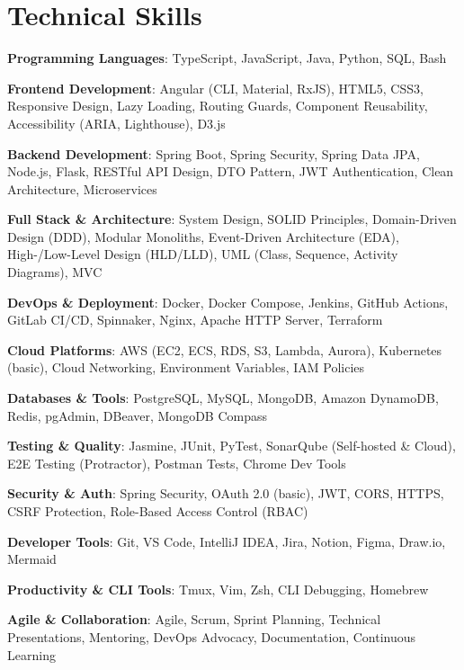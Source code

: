 \documentclass[10pt, letterpaper]{article}
\newenvironment{onecolentry}{\begin{adjustwidth}{0 cm}{0 cm}}{\end{adjustwidth}}
\begin{document}
\section{Technical Skills}
\begin{onecolentry}
    \item \textbf{Programming Languages}: TypeScript, JavaScript, Java, Python, SQL, Bash
    \item \textbf{Frontend Development}: Angular (CLI, Material, RxJS), HTML5, CSS3, Responsive Design, Lazy Loading, Routing Guards, Component Reusability, Accessibility (ARIA, Lighthouse), D3.js
    \item \textbf{Backend Development}: Spring Boot, Spring Security, Spring Data JPA, Node.js, Flask, RESTful API Design, DTO Pattern, JWT Authentication, Clean Architecture, Microservices
    \item \textbf{Full Stack \& Architecture}: System Design, SOLID Principles, Domain-Driven Design (DDD), Modular Monoliths, Event-Driven Architecture (EDA), High-/Low-Level Design (HLD/LLD), UML (Class, Sequence, Activity Diagrams), MVC
    \item \textbf{DevOps \& Deployment}: Docker, Docker Compose, Jenkins, GitHub Actions, GitLab CI/CD, Spinnaker, Nginx, Apache HTTP Server, Terraform
    \item \textbf{Cloud Platforms}: AWS (EC2, ECS, RDS, S3, Lambda, Aurora), Kubernetes (basic), Cloud Networking, Environment Variables, IAM Policies
    \item \textbf{Databases \& Tools}: PostgreSQL, MySQL, MongoDB, Amazon DynamoDB, Redis, pgAdmin, DBeaver, MongoDB Compass
    \item \textbf{Testing \& Quality}: Jasmine, JUnit, PyTest, SonarQube (Self-hosted \& Cloud), E2E Testing (Protractor), Postman Tests, Chrome Dev Tools
    \item \textbf{Security \& Auth}: Spring Security, OAuth 2.0 (basic), JWT, CORS, HTTPS, CSRF Protection, Role-Based Access Control (RBAC)
    \item \textbf{Developer Tools}: Git, VS Code, IntelliJ IDEA, Jira, Notion, Figma, Draw.io, Mermaid
    \item \textbf{Productivity \& CLI Tools}: Tmux, Vim, Zsh, CLI Debugging, Homebrew
    \item \textbf{Agile \& Collaboration}: Agile, Scrum, Sprint Planning, Technical Presentations, Mentoring, DevOps Advocacy, Documentation, Continuous Learning
\end{onecolentry}
\end{document}
